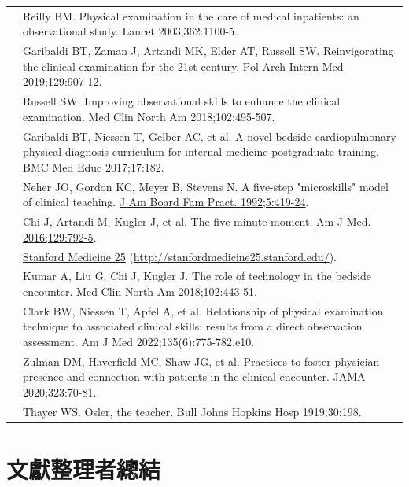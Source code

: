 \documentclass[12pt,a4paper]{article}
\begin{document}
\begin{longtable}{>{\raggedright\arraybackslash}p{1.5cm} >{\raggedright\arraybackslash}p{13.5cm}}
21 & Reilly BM. Physical examination in the care of medical inpatients: an observational study. Lancet 2003;362:1100-5. \\

27 & Garibaldi BT, Zaman J, Artandi MK, Elder AT, Russell SW. Reinvigorating the clinical examination for the 21st century. Pol Arch Intern Med 2019;129:907-12. \\

30 & Russell SW. Improving observational skills to enhance the clinical examination. Med Clin North Am 2018;102:495-507. \\

34 & Garibaldi BT, Niessen T, Gelber AC, et al. A novel bedside cardiopulmonary physical diagnosis curriculum for internal medicine postgraduate training. BMC Med Educ 2017;17:182. \\

37 & Neher JO, Gordon KC, Meyer B, Stevens N. A five-step "microskills" model of clinical teaching. \href{https://pubmed.ncbi.nlm.nih.gov/1496899/}{J Am Board Fam Pract. 1992;5:419-24}. \\

38 & Chi J, Artandi M, Kugler J, et al. The five-minute moment. \href{https://www.amjmed.com/article/S0002-9343(16)30209-1/fulltext}{Am J Med. 2016;129:792-5}. \\

44 & \href{https://stanfordmedicine25.stanford.edu/}{Stanford Medicine 25} (\url{http://stanfordmedicine25.stanford.edu/}). \\

48 & Kumar A, Liu G, Chi J, Kugler J. The role of technology in the bedside encounter. Med Clin North Am 2018;102:443-51. \\

63 & Clark BW, Niessen T, Apfel A, et al. Relationship of physical examination technique to associated clinical skills: results from a direct observation assessment. Am J Med 2022;135(6):775-782.e10. \\

69 & Zulman DM, Haverfield MC, Shaw JG, et al. Practices to foster physician presence and connection with patients in the clinical encounter. JAMA 2020;323:70-81. \\

75 & Thayer WS. Osler, the teacher. Bull Johns Hopkins Hosp 1919;30:198. \\
\end{longtable}

\section{文獻整理者總結}
\end{document}

